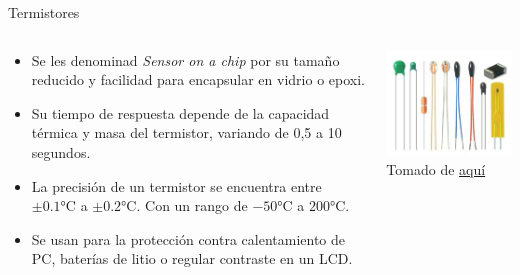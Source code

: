 \documentclass[aspectratio=169]{beamer}
\begin{document}
\begin{frame}{Termistores}
    \begin{columns}[c, onlytextwidth]
        \begin{column}{0.55\textwidth}
            \begin{itemize}
                \item Se les denominad \textit{Sensor on a chip} por su tamaño reducido y facilidad para encapsular en vidrio o epoxi.
                \item Su tiempo de respuesta depende de la capacidad térmica y masa del termistor, variando de 0,5 a 10 segundos.  
                \item La precisión de un termistor se encuentra entre $\pm 0.1 {\si{\celsius}}$ a $\pm 0.2 {\si{\celsius}}$. Con un rango de $-50 {\si{\celsius}}$ a $200 {\si{\celsius}}$.
                \item Se usan para la protección contra calentamiento de PC, baterías de litio o regular contraste en un LCD. 
            \end{itemize}
        \end{column}
        \begin{column}{0.40\textwidth}
           \includegraphics[width=6.5cm]{fig/Thermistor_type.PNG}
            \\ \tiny{Tomado de \href{https://es.made-in-china.com/co_jpsensor/product_Ntc-10K-Thermistor-Collection_reeeohegg.html}{aquí}}
        \end{column}
    \end{columns}
\end{frame}
\end{document}
